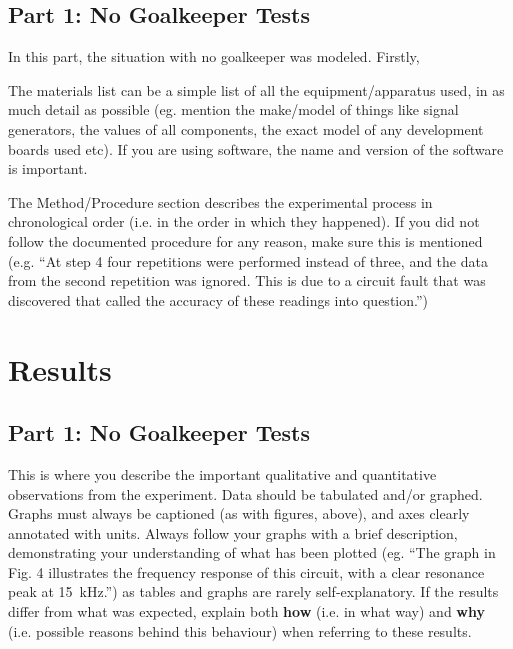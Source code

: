 \documentclass[11pt, a4paper]{article}
\begin{document}
\subsection{Part 1: No Goalkeeper Tests}

In this part, the situation with no goalkeeper was modeled. Firstly, 


The materials list can be a simple list of all the equipment/apparatus used, in as much detail as possible (eg. mention the make/model of things like signal generators, the values of all components, the exact model of any development boards used etc). If you are using software, the name and version of the software is important.\cite{ref:Bibby} 

The Method/Procedure section describes the experimental process in chronological order (i.e. in the order in which they happened). If you did not follow the documented procedure for any reason, make sure this is mentioned (e.g. ``At step 4 four repetitions were performed instead of three, and the data from the second repetition was ignored. This is due to a circuit fault that was discovered that called the accuracy of these readings into question.'')

%


\section{Results}

\subsection{Part 1: No Goalkeeper Tests}

This is where you describe the important qualitative and quantitative observations from the experiment. Data should be tabulated and/or graphed. Graphs must always be captioned (as with figures, above), and axes clearly annotated with units. Always follow your graphs with a brief description, demonstrating your understanding of what has been plotted (eg. ``The graph in Fig. 4 illustrates the frequency response of this circuit, with a clear resonance peak at 15~kHz.'') as tables and graphs are rarely self-explanatory. If the results differ from what was expected, explain both \textbf{how} (i.e. in what way) and \textbf{why} (i.e. possible reasons behind this behaviour) when referring to these results.
\end{document}

